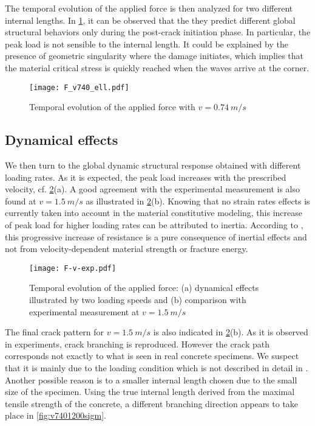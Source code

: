 The temporal evolution of the applied force is then analyzed for two different internal lengths. In \cref{fig:F_v740_ell}, it can be observed that the they predict different global structural behaviors only during the post-crack initiation phase. In particular, the peak load is not sensible to the internal length. It could be explained by the presence of geometric singularity where the damage initiates, which implies that the material critical stress is quickly reached when the waves arrive at the corner.
\begin{figure}[htbp]
\centering
\texttt{[image: F\_v740\_ell.pdf]}
\caption{Temporal evolution of the applied force with $v=\SI{0.74}{m/s}$} \label{fig:F_v740_ell}
\end{figure}

\subsection{Dynamical effects}
We then turn to the global dynamic structural response obtained with different loading rates. As it is expected, the peak load increases with the prescribed velocity, cf. \cref{fig:F-v-exp}(a). A good agreement with the experimental measurement is also found at $v=\SI{1.5}{m/s}$ as illustrated in \cref{fig:F-v-exp}(b). Knowing that no strain rates effects is currently taken into account in the material constitutive modeling, this increase of peak load for higher loading rates can be attributed to inertia. According to \cite{OzboltBedeSharmaMayer:2015}, this progressive increase of resistance is a pure consequence of inertial effects and not from velocity-dependent material strength or fracture energy.
\begin{figure}[htbp]
\centering
\texttt{[image: F-v-exp.pdf]}
\caption{Temporal evolution of the applied force: (a) dynamical effects illustrated by two loading speeds and (b) comparison with experimental measurement at $v=\SI{1.5}{m/s}$} \label{fig:F-v-exp}
\end{figure}

The final crack pattern for $v=\SI{1.5}{m/s}$ is also indicated in \cref{fig:F-v-exp}(b). As it is observed in experiments, crack branching is reproduced. However the crack path corresponds not exactly to what is seen in real concrete specimens. We suspect that it is mainly due to the loading condition which is not described in detail in \cite{OzboltBedeSharmaMayer:2015}. Another possible reason is to a smaller internal length chosen due to the small size of the specimen. Using the true internal length derived from the maximal tensile strength of the concrete, a different branching direction appears to take place in \cref{fig:v7401200sigm}.

